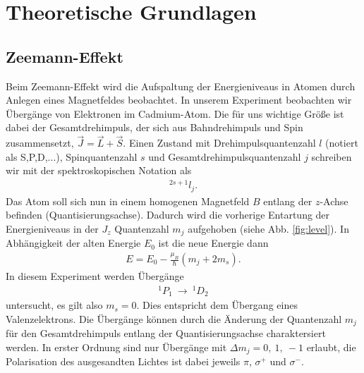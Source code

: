\section{Theoretische Grundlagen}
\subsection{Zeemann-Effekt}
Beim Zeemann-Effekt wird die Aufspaltung der Energieniveaus in Atomen durch Anlegen eines Magnetfeldes beobachtet. In unserem Experiment beobachten wir Übergänge von Elektronen im Cadmium-Atom. Die für uns wichtige Größe ist dabei der Gesamtdrehimpuls, der sich aus Bahndrehimpuls und Spin zusammensetzt, $\vec{J}=\vec{L}+\vec{S}$. Einen Zustand mit Drehimpulsquantenzahl $l$ (notiert als S,P,D,...), Spinquantenzahl $s$ und Gesamtdrehimpulsquantenzahl $j$ schreiben wir mit der spektroskopischen Notation als
\begin{align*}
  ^{2s+1}l_j.
\end{align*}
Das Atom soll sich nun in einem homogenen Magnetfeld $B$ entlang der $z$-Achse befinden (Quantisierungsachse). Dadurch wird die vorherige Entartung der Energieniveaus in der $J_z$ Quantenzahl $m_j$ aufgehoben (siehe Abb. \ref{fig:level}). In Abhängigkeit der alten Energie $E_0$ ist die neue Energie dann
\begin{align*}
  E=E_0-\frac{\mu_B}{\hbar}\left( m_j+2m_s\right).
\end{align*}
In diesem Experiment werden Übergänge 
\begin{align*}
  ^1P_1 \ \rightarrow \ ^1D_2
\end{align*}
untersucht, es gilt also $m_s=0$. Dies entspricht dem Übergang eines Valenzelektrons. Die Übergänge können durch die Änderung der Quantenzahl $m_j$ für den Gesamtdrehimpuls entlang der Quantisierungsachse charaktersiert werden. In erster Ordnung sind nur Übergänge mit $\Delta m_j=0, \ 1, \ -1$ erlaubt, die Polarisation des ausgesandten Lichtes ist dabei jeweils $\pi$, $\sigma ^+$ und $\sigma^-$.

